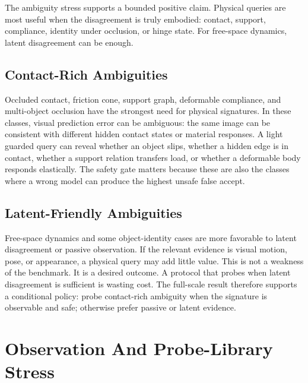 \documentclass{article}
\begin{document}
The ambiguity stress supports a bounded positive claim. Physical queries are most useful when the disagreement is truly embodied: contact, support, compliance, identity under occlusion, or hinge state. For free-space dynamics, latent disagreement can be enough.

\subsection{Contact-Rich Ambiguities}

Occluded contact, friction cone, support graph, deformable compliance, and multi-object occlusion have the strongest need for physical signatures. In these classes, visual prediction error can be ambiguous: the same image can be consistent with different hidden contact states or material responses. A light guarded query can reveal whether an object slips, whether a hidden edge is in contact, whether a support relation transfers load, or whether a deformable body responds elastically. The safety gate matters because these are also the classes where a wrong model can produce the highest unsafe false accept.

\subsection{Latent-Friendly Ambiguities}

Free-space dynamics and some object-identity cases are more favorable to latent disagreement or passive observation. If the relevant evidence is visual motion, pose, or appearance, a physical query may add little value. This is not a weakness of the benchmark. It is a desired outcome. A protocol that probes when latent disagreement is sufficient is wasting cost. The full-scale result therefore supports a conditional policy: probe contact-rich ambiguity when the signature is observable and safe; otherwise prefer passive or latent evidence.

\section{Observation And Probe-Library Stress}

\begin{table}[t]
\centering
\small
\resizebox{0.86\linewidth}{!}{}
\caption{Observation-regime summary. Better observation regimes improve signature match and utility.}
\label{tab:observation}
\end{table}
\end{document}
